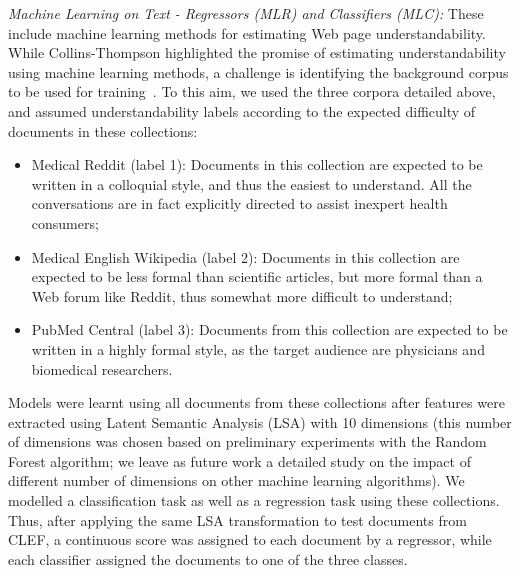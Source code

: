 


\textit{Machine Learning on Text - Regressors (MLR) and Classifiers (MLC):} These include machine learning methods for estimating Web page understandability. While Collins-Thompson highlighted the promise of estimating understandability using machine learning methods, a challenge is identifying the background corpus to be used for training~\cite{collins2014computational}. To this aim, we used the three corpora detailed above, and assumed understandability labels according to the expected difficulty of documents in these collections:

\begin{itemize}[leftmargin=*]
    \item Medical Reddit (label 1): Documents in this collection are expected to be written in a colloquial style, and thus the easiest to understand. All the conversations are in fact explicitly directed to assist inexpert health consumers;
    \item Medical English Wikipedia (label 2): Documents in this collection are expected to be less formal than scientific articles, but more formal than a Web forum like Reddit, thus somewhat more difficult to understand;
    \item PubMed Central (label 3): Documents from this collection are expected to be written in a highly formal style, as the target audience are physicians and biomedical researchers.
\end{itemize}

Models were learnt using all documents from these collections after features were extracted using Latent Semantic Analysis (LSA) with 10 dimensions (this number of dimensions was chosen based on preliminary experiments with the Random Forest algorithm; we leave as future work a detailed study on the impact of different number of dimensions on other machine learning algorithms). We modelled a classification task as well as a regression task using these collections. Thus, after applying the same LSA transformation to test documents from CLEF, a continuous score was assigned to each document by a regressor, while each classifier assigned the documents to one of the three classes. %


